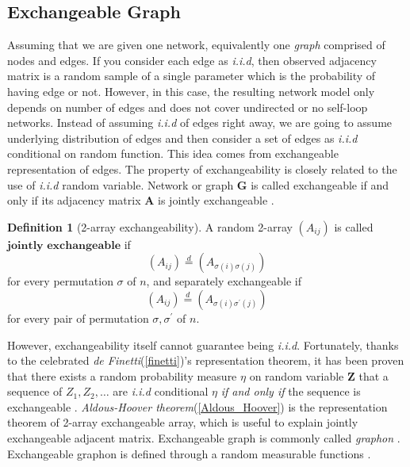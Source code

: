 \documentclass[12pt]{article}
\theoremstyle{definition}
\newtheorem{definition}{Definition}[section]
\begin{document}
	\subsection{Exchangeable Graph}
	
	Assuming that we are given one network, equivalently one \textit{graph} comprised of nodes and edges. If you consider each edge as \textit{i.i.d}, then observed adjacency matrix is a random sample of a single parameter which is the probability of having edge or not. However, in this case, the resulting network model only depends on number of edges \citep{orbanz2015bayesian} and does not cover undirected or no self-loop networks. Instead of assuming \textit{i.i.d} of edges right away, we are going to assume underlying distribution of edges and then consider a set of edges as \textit{i.i.d} conditional on random function. This idea comes from exchangeable representation of edges.
	The property of exchangeability is closely related to the use of \textit{i.i.d} random variable. Network or graph $\mathbf{G}$ is called exchangeable if and only if its adjacency matrix $\mathbf{A}$ is jointly exchangeable \citep{orbanz2015bayesian}. 
	
	\begin{definition}[2-array exchangeability]
		\label{exchangeability}
		A random 2-array $(A_{ij})$ is called $\mathbf{\mbox{jointly exchangeable}}$ if 
		$$(A_{ij}) \stackrel{d}{=} (A_{\sigma(i) \sigma(j)})$$
		for every permutation $\sigma$ of $n$,
		and separately exchangeable if 
		$$(A_{ij}) \stackrel{d}{=} (A_{\sigma(i) \sigma^{\prime}(j) })$$
		for every pair of permutation $\sigma, \sigma^{\prime}$ of $n$.
	\end{definition}
	
	However, exchangeability itself cannot guarantee being \textit{i.i.d}. Fortunately, thanks to the celebrated  \textit{de Finetti}(\ref{finetti})'s representation theorem, it has been proven that there exists a random probability measure $\eta$ on random variable $\mathbf{Z}$ that a sequence of $Z_{1}, Z_{2}, \ldots $ are \textit{i.i.d} conditional $\eta$ \textit{if and only if} the sequence is exchangeable \citep{orbanz2015bayesian, caron2014sparse}. \textit{Aldous-Hoover theorem}(\ref{Aldous_Hoover}) is the representation theorem of 2-array exchangeable array, which is useful to explain jointly exchangeable adjacent matrix. Exchangeable graph is commonly called \textit{graphon} \citep{lovasz2006limits}. Exchangeable graphon is defined through a random measurable functions \citep{chan2013estimation}.
	
\end{document}
